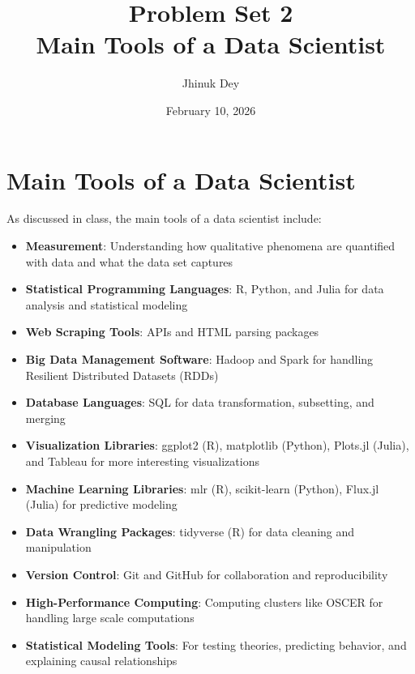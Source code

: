 \documentclass{article}
\begin{document}
\title{\textbf{Problem Set 2} \\ Main Tools of a Data Scientist}
\author{Jhinuk Dey}
\date{February 10, 2026}
\maketitle

\section*{Main Tools of a Data Scientist}

As discussed in class, the main tools of a data scientist include:

\begin{itemize}
    \item \textbf{Measurement}: Understanding how qualitative phenomena are quantified with data and what the data set captures
    
    \item \textbf{Statistical Programming Languages}: R, Python, and Julia for data analysis and statistical modeling
    
    \item \textbf{Web Scraping Tools}: APIs and HTML parsing packages 
    
    \item \textbf{Big Data Management Software}: Hadoop and Spark for handling Resilient Distributed Datasets (RDDs)
    
    \item \textbf{Database Languages}: SQL for data transformation, subsetting, and merging
    
    \item \textbf{Visualization Libraries}: ggplot2 (R), matplotlib (Python), Plots.jl (Julia), and Tableau for more interesting visualizations
    
    \item \textbf{Machine Learning Libraries}: mlr (R), scikit-learn (Python), Flux.jl (Julia) for predictive modeling
    
    \item \textbf{Data Wrangling Packages}: tidyverse (R) for data cleaning and manipulation
    
    \item \textbf{Version Control}: Git and GitHub for collaboration and reproducibility
    
    \item \textbf{High-Performance Computing}: Computing clusters like OSCER for handling large scale computations
    
    \item \textbf{Statistical Modeling Tools}: For testing theories, predicting behavior, and explaining causal relationships
\end{itemize}
\end{document}
